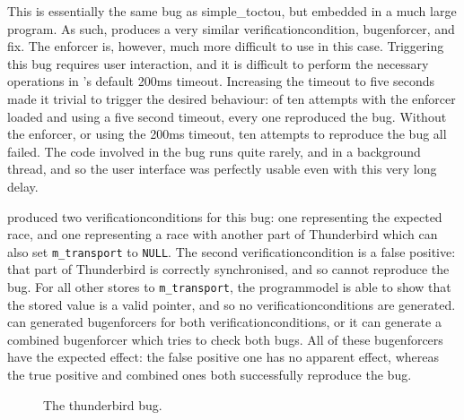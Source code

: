 This is essentially the same bug as simple\_toctou, but embedded in a
much large program.  As such, {\implementation} produces a very
similar \gls{verificationcondition}, \gls{bugenforcer}, and fix.  The
enforcer is, however, much more difficult to use in this case.
Triggering this bug requires user interaction, and it is difficult to
perform the necessary operations in {\implementation}'s default 200ms
timeout.  Increasing the timeout to five seconds made it trivial to
trigger the desired behaviour: of ten attempts with the enforcer
loaded and using a five second timeout, every one reproduced the bug.
Without the enforcer, or using the 200ms timeout, ten attempts to
reproduce the bug all failed.  The code involved in the bug runs quite
rarely, and in a background thread, and so the user interface was
perfectly usable even with this very long delay.

{\Implementation} produced two \glspl{verificationcondition} for this
bug: one representing the expected race, and one representing a race
with another part of Thunderbird which can also set
\texttt{m\_transport} to \texttt{NULL}.  The second
\gls{verificationcondition} is a false positive: that part of
Thunderbird is correctly synchronised, and so cannot reproduce the
bug.  For all other stores to \texttt{m\_transport}, the
\gls{programmodel} is able to show that the stored value is a valid
pointer, and so no \glspl{verificationcondition} are generated.
{\Implementation} can generated \glspl{bugenforcer} for both
\glspl{verificationcondition}, or it can generate a combined
\gls{bugenforcer} which tries to check both bugs.  All of these
\glspl{bugenforcer} have the expected effect: the false positive one
has no apparent effect, whereas the true positive and combined ones
both successfully reproduce the bug.

\begin{figure}
  \vspace{-6pt}
  \caption{The thunderbird bug.}
  \label{fig:eval:thunderbird}
\end{figure}

